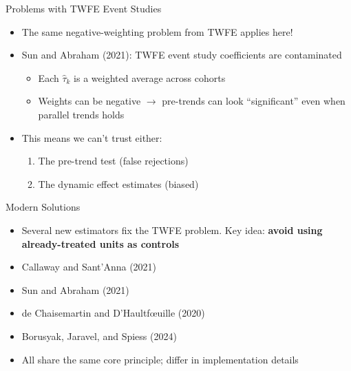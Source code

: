 \documentclass[10pt, handout]{beamer}
\begin{document}
\begin{frame}{Problems with TWFE Event Studies}
  \begin{itemize}
    \item The same negative-weighting problem from TWFE applies here!
    \item Sun and Abraham (2021): TWFE event study coefficients are contaminated
      \begin{itemize}
        \item Each $\hat{\tau}_k$ is a weighted average across cohorts
        \item Weights can be negative $\to$ pre-trends can look ``significant'' even when parallel trends holds
      \end{itemize}
    \item This means we can't trust either:
      \begin{enumerate}
        \item The pre-trend test (false rejections)
        \item The dynamic effect estimates (biased)
      \end{enumerate}
  \end{itemize}
\end{frame}


\begin{frame}{Modern Solutions}
  \begin{itemize}
    \item Several new estimators fix the TWFE problem. Key idea: \textbf{avoid using already-treated units as controls}
    \item Callaway and Sant'Anna (2021)
    \item Sun and Abraham (2021)
    \item de Chaisemartin and D'Haultf\oe uille (2020)
    \item Borusyak, Jaravel, and Spiess (2024)
    \vspace{0.2cm}
    \item All share the same core principle; differ in implementation details
  \end{itemize}
\end{frame}
\end{document}
